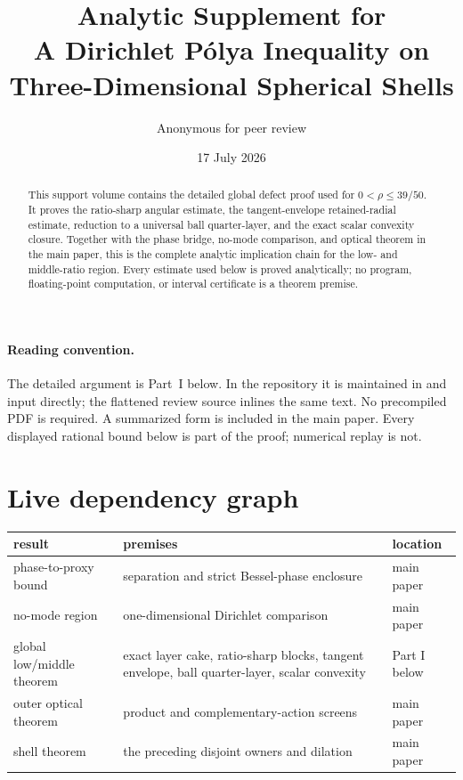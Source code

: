 \documentclass[11pt]{article}
\title{Analytic Supplement for\\
A Dirichlet P\'olya Inequality on\\
Three-Dimensional Spherical Shells}
\author{Anonymous for peer review}
\date{17 July 2026}
\theoremstyle{remark}
\begin{document}
\maketitle

\begin{abstract}
This support volume contains the detailed global defect proof used for
$0<\rho\leq39/50$.  It proves the ratio-sharp angular estimate, the
tangent-envelope retained-radial estimate, reduction to a universal ball
quarter-layer, and the exact scalar convexity closure.  Together with the
phase bridge, no-mode comparison, and optical theorem in the main paper,
this is the complete analytic implication chain for the low- and middle-ratio
region.  Every estimate used below is proved analytically; no program,
floating-point computation, or interval certificate is a theorem premise.
\end{abstract}

\paragraph{Reading convention.}
The detailed argument is Part~I below.  In the repository it is maintained in
 and input directly; the
flattened review source inlines the same text.  No precompiled PDF is required.
A summarized form is included in the main paper.  Every displayed rational
bound below is part of the proof; numerical replay is not.

\section*{Live dependency graph}

\begin{center}
\small
\renewcommand{\arraystretch}{1.15}
\begin{tabular}{@{}p{3.3cm}p{5.1cm}p{3.2cm}@{}}
\toprule
result&premises&location\\
\midrule
phase-to-proxy bound&
separation and strict Bessel-phase enclosure&
main paper\\
no-mode region&
one-dimensional Dirichlet comparison&
main paper\\
global low/middle theorem&
exact layer cake, ratio-sharp blocks, tangent envelope,
ball quarter-layer, scalar convexity&
Part I below\\
outer optical theorem&
product and complementary-action screens&
main paper\\
shell theorem&
the preceding disjoint owners and dilation&
main paper\\
\bottomrule
\end{tabular}
\end{center}
\end{document}
